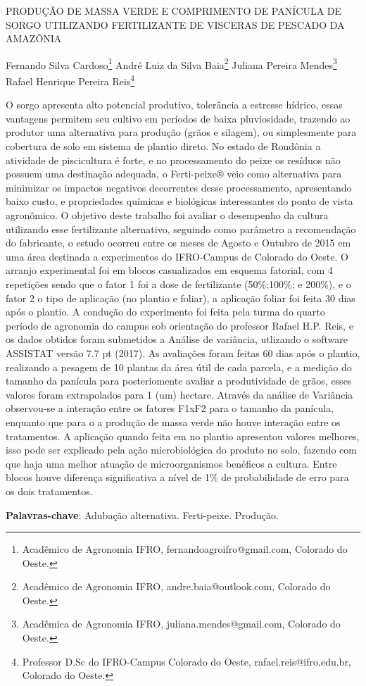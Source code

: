 \documentclass[article,12pt,onesidea,4paper,english,brazil]{abntex2}
\begin{document}
	
	
	\frenchspacing 
	
	\begin{center}
		\LARGE PRODUÇÃO DE MASSA VERDE E COMPRIMENTO DE PANÍCULA DE SORGO
		UTILIZANDO FERTILIZANTE DE VISCERAS DE PESCADO DA AMAZÔNIA
		
		\normalsize
	Fernando Silva Cardoso\footnote{Acadêmico de Agronomia IFRO, fernandoagroifro@gmail.com, Colorado do Oeste.} 
	André Luiz da Silva Baia\footnote{Acadêmico de Agronomia IFRO, andre.baia@outlook.com, Colorado do Oeste.} 
	Juliana Pereira Mendes\footnote{Acadêmica de Agronomia IFRO, juliana.mendes@gmail.com, Colorado do Oeste.} 
	Rafael Henrique Pereira Reis\footnote{Professor D.Sc do IFRO-Campus Colorado do Oeste, rafael.reis@ifro.edu.br, Colorado do Oeste.} 
	\end{center}
	
	\noindent O sorgo apresenta alto potencial produtivo, tolerância a estresse hídrico, essas
	vantagens permitem seu cultivo em períodos de baixa pluviosidade, trazendo ao
	produtor uma alternativa para produção (grãos e silagem), ou simplesmente para
	cobertura de solo em sistema de plantio direto. No estado de Rondônia a atividade
	de piscicultura é forte, e no processamento do peixe os resíduos não possuem uma
	destinação adequada, o Ferti-peixe® veio como alternativa para minimizar os
	impactos negativos decorrentes desse processamento, apresentando baixo custo, e
	propriedades químicas e biológicas interessantes do ponto de vista agronômico. O
	objetivo deste trabalho foi avaliar o desempenho da cultura utilizando esse
	fertilizante alternativo, seguindo como parâmetro a recomendação do fabricante, o
	estudo ocorreu entre os meses de Agosto e Outubro de 2015 em uma área
	destinada a experimentos do IFRO-Campus de Colorado do Oeste. O arranjo
	experimental foi em blocos casualizados em esquema fatorial, com 4 repetições
	sendo que o fator 1 foi a dose de fertilizante (50\%;100\%; e 200\%), e o fator 2 o tipo
	de aplicação (no plantio e foliar), a aplicação foliar foi feita 30 dias após o plantio. A
	condução do experimento foi feita pela turma do quarto período de agronomia do
	campus sob orientação do professor Rafael H.P. Reis, e os dados obtidos foram
	submetidos a Análise de variância, utlizando o software ASSISTAT versão 7.7 pt
	(2017). As avaliações foram feitas 60 dias após o plantio, realizando a pesagem de
	10 plantas da área útil de cada parcela, e a medição do tamanho da panícula para
	posteriomente avaliar a produtividade de grãos, esses valores foram extrapolados
	para 1 (um) hectare. Através da análise de Variância observou-se a interação entre
	os fatores F1xF2 para o tamanho da panícula, enquanto que para o a produção de
	massa verde não houve interação entre os tratamentos. A aplicação quando feita em
	no plantio apresentou valores melhores, isso pode ser explicado pela ação
	microbiológica do produto no solo, fazendo com que haja uma melhor atuação de
	microorganismos benéficos a cultura. Entre blocos houve diferença significativa a
	nível de 1\% de probabilidade de erro para os dois tratamentos.
	
	\vspace{\onelineskip}
	
	\noindent
	\textbf{Palavras-chave}: Adubação alternativa. Ferti-peixe. Produção.
	
\end{document}
